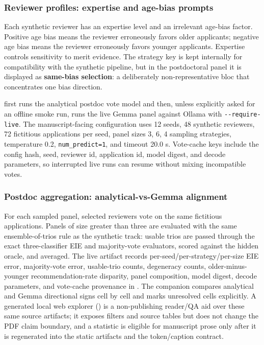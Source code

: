 \documentclass[
]{article}
\begin{document}
\subsubsection{Reviewer profiles: expertise and age-bias
prompts}\label{reviewer-profiles-expertise-and-age-bias-prompts}

Each synthetic reviewer has an expertise level and an irrelevant
age-bias factor. Positive age bias means the reviewer erroneously favors
older applicants; negative age bias means the reviewer erroneously
favors younger applicants. Expertise controls sensitivity to merit
evidence. The  strategy key is kept
internally for compatibility with the synthetic pipeline, but in the
postdoctoral panel it is displayed as \textbf{same-bias selection}: a
deliberately non-representative bloc that concentrates one bias
direction.

 first runs the analytical
postdoc vote model and then, unless explicitly asked for an offline
smoke run, runs the live Gemma panel against Ollama with
\texttt{-\/-require-live}. The manuscript-facing configuration uses 12
seeds, 48 synthetic reviewers, 72 fictitious applications per seed,
panel sizes 3, 6, 4 sampling strategies, temperature 0.2,
\texttt{num\_predict=1}, and timeout 20.0 s. Vote-cache keys include the
config hash, seed, reviewer id, application id, model digest, and decode
parameters, so interrupted live runs can resume without mixing
incompatible votes.

\subsubsection{Postdoc aggregation: analytical-vs-Gemma
alignment}\label{postdoc-aggregation-analytical-vs-gemma-alignment}

For each sampled panel, selected reviewers vote on the same fictitious
applications. Panels of size greater than three are evaluated with the
same ensemble-of-trios rule as the synthetic track: usable trios are
passed through the exact three-classifier EIE and majority-vote
evaluators, scored against the hidden oracle, and averaged. The live
artifact records per-seed/per-strategy/per-size EIE error, majority-vote
error, usable-trio counts, degeneracy counts, older-minus-younger
recommendation-rate disparity, panel composition, model digest, decode
parameters, and vote-cache provenance in
. The companion
 compares analytical
and Gemma directional signs cell by cell and marks unresolved cells
explicitly. A generated local web explorer
() is a non-publishing reader/QA
aid over these same source artifacts; it exposes filters and source
tables but does not change the PDF claim boundary, and a statistic is
eligible for manuscript prose only after it is regenerated into the
static artifacts and the token/caption contract.
\end{document}
